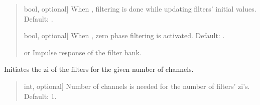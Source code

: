 \documentclass[letterpaper,10pt,english]{sphinxmanual}
\begin{document}
\begin{fulllineitems}
\begin{fulllineitems}
\begin{quote}
\begin{description}
\begin{description}
\sphinxlineitem{\sphinxstylestrong{test\_zi}}{[}bool, optional{]}
\sphinxAtStartPar
When , filtering is done while updating filters’ initial
values. Default: .

\sphinxlineitem{\sphinxstylestrong{zero\_phase}}{[}bool, optional{]}
\sphinxAtStartPar
When , zero phase filtering is activated. Default: .

\end{description}

\begin{description}
\sphinxlineitem{\sphinxstylestrong{ir}}{[} or \sphinxtitleref{Signal}{]}
\sphinxAtStartPar
Impulse response of the filter bank.

\end{description}

\end{description}\end{quote}

\end{fulllineitems}


\begin{fulllineitems}
\label{\detokenize{classes:dsptoolbox.classes.filterbank.FilterBank.initialize_zi}}
\pysigstartsignatures
{}
\pysigstopsignatures
\sphinxAtStartPar
Initiates the zi of the filters for the given number of channels.
\begin{quote}\begin{description}
\begin{description}
\sphinxlineitem{\sphinxstylestrong{number\_of\_channels}}{[}int, optional{]}
\sphinxAtStartPar
Number of channels is needed for the number of filters’ zi’s.
Default: 1.

\end{description}

\end{description}\end{quote}


\end{fulllineitems}
\end{fulllineitems}
\end{document}
